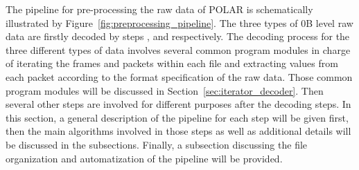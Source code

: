 \documentclass{raa}
\begin{document}
The pipeline for pre-processing the raw data of POLAR is schematically illustrated by Figure~\ref{fig:preprocessing_pipeline}. The three types of 0B level raw data are firstly decoded by steps ,  and  respectively. The decoding process for the three different types of data involves several common program modules in charge of iterating the frames and packets within each file and extracting values from each packet according to the format specification of the raw data. Those common program modules will be discussed in Section~\ref{sec:iterator_decoder}. Then several other steps are involved for different purposes after the decoding steps. In this section, a general description of the pipeline for each step will be given first, then the main algorithms involved in those steps as well as additional details will be discussed in the subsections. Finally, a subsection discussing the file organization and automatization of the pipeline will be provided.
\end{document}
